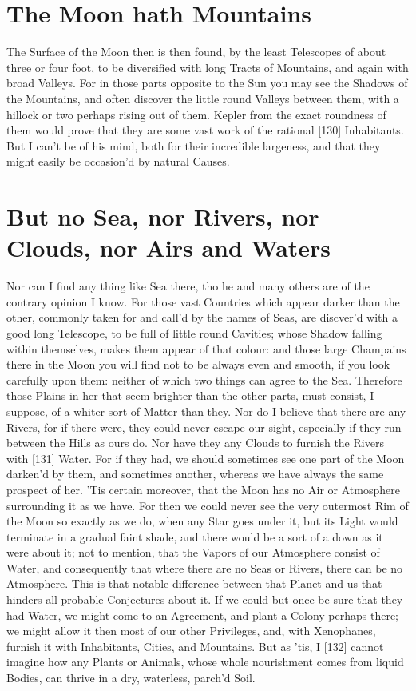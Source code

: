 \documentclass[letterpaper]{book}
\begin{document}
\section{The Moon hath Mountains}

The Surface of the Moon then is then found, by the least Telescopes of
about three or four foot, to be diversified with long Tracts of Mountains,
and again with broad Valleys. For in those parts opposite to the Sun you
may see the Shadows of the Mountains, and often discover the little round
Valleys between them, with a hillock or two perhaps rising out of them.
Kepler from the exact roundness of them would prove that they are some
vast work of the rational [130] Inhabitants. But I can't be of his mind, both
for their incredible largeness, and that they might easily be occasion'd by
natural Causes.


\section{But no Sea, nor Rivers, nor Clouds, nor Airs and Waters}

Nor can I find any thing like Sea there, tho he and many others are of the
contrary opinion I know. For those vast Countries which appear darker than
the other, commonly taken for and call'd by the names of Seas, are discver'd
with a good long Telescope, to be full of little round Cavities; whose
Shadow falling within themselves, makes them appear of that colour: and
those large Champains there in the Moon you will find not to be always even
and smooth, if you look carefully upon them: neither of which two things can
agree to the Sea. Therefore those Plains in her that seem brighter than the
other parts, must consist, I suppose, of a whiter sort of Matter than they.
Nor do I believe that there are any Rivers, for if there were, they could
never escape our sight, especially if they run between the Hills as ours
do.  Nor have they any Clouds to furnish the Rivers with [131] Water. For if
they had, we should sometimes see one part of the Moon darken'd by them, and
sometimes another, whereas we have always the same prospect of her.  'Tis
certain moreover, that the Moon has no Air or Atmosphere surrounding it as
we have. For then we could never see the very outermost Rim of the Moon so
exactly as we do, when any Star goes under it, but its Light would terminate
in a gradual faint shade, and there would be a sort of a down as it were
about it; not to mention, that the Vapors of our Atmosphere consist of
Water, and consequently that where there are no Seas or Rivers, there can be
no Atmosphere. This is that notable difference between that Planet and us
that hinders all probable Conjectures about it. If we could but once be sure
that they had Water, we might come to an Agreement, and plant a Colony
perhaps there; we might allow it then most of our other Privileges, and,
with Xenophanes, furnish it with Inhabitants, Cities, and Mountains. But as
'tis, I [132] cannot imagine how any Plants or Animals, whose whole
nourishment comes from liquid Bodies, can thrive in a dry, waterless,
parch'd Soil.
\end{document}
